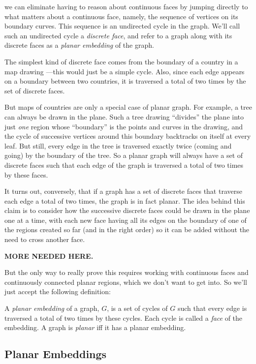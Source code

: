 we can eliminate having to reason about continuous faces by jumping
directly to what matters about a continuous face, namely, the sequence of
vertices on its boundary curves.  This sequence is an undirected cycle in
the graph.  We'll call such an undirected cycle a \emph{discrete face},
and refer to a graph along with its discrete faces as a \emph{planar
embedding} of the graph.

The simplest kind of discrete face comes from the boundary of a country in
a map drawing ---this would just be a simple cycle.  Also, since each edge
appears on a boundary between two countries, it is traversed a total of
two times by the set of discrete faces.

But maps of countries are only a special case of planar graph.  For
example, a tree can always be drawn in the plane.  Such a tree drawing
``divides'' the plane into just \emph{one} region whose ``boundary'' is
the points and curves in the drawing, and the cycle of successive vertices
around this boundary backtracks on itself at every leaf.  But still, every
edge in the tree is traversed exactly twice (coming and going) by the
boundary of the tree.  So a planar graph will always have a set of
discrete faces such that each edge of the graph is traversed a total of
two times by these faces.

It turns out, conversely, that if a graph has a set of discrete faces that
traverse each edge a total of two times, the graph is in fact planar.  The
idea behind this claim is to consider how the successive discrete faces
could be drawn in the plane one at a time, with each new face having all
its edges on the boundary of one of the regions created so far (and in the
right order) so it can be added without the need to cross another face.

\textbf{MORE NEEDED HERE.}

But the only way to really prove this requires working with continuous
faces and continuously connected planar regions, which we don't want to
get into.  So we'll just accept the following definition:

\begin{definition}
A \emph{planar embedding} of a graph, $G$, is a set of cycles of $G$ such
that every edge is traversed a total of two times by these cycles.  Each
cycle is called a \emph{face} of the embedding.  A graph is \emph{planar}
iff it has a planar embedding.
\end{definition}
\fi

\subsection{Planar Embeddings}

